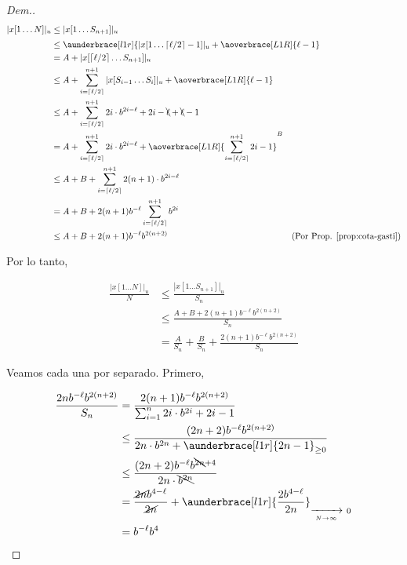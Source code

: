 \documentclass{article}
\DeclarePairedDelimiter\ceil{\lceil}{\rceil}
\theoremstyle{definition} %
\begin{document}
\begin{proof}[Dem.]
\begin{align*}
    |x[1\dots N]|_u
        &\leq |x[1\dots S_{n+1}]|_u \\
        &\leq 
            \aunderbrace[l1r]{|x[1\dots \ceil{\ell/2} - 1]|_u
            + \aoverbrace[L1R]{\ell - 1}^{\hidewidth\text{entre bloques}\hidewidth}}_{A}
            + |x[\ceil{\ell/2} \dots S_{n+1}]|_u \\
        & = A + |x[\ceil{\ell/2} \dots S_{n+1}]|_u \\
        &\leq A +
            \sum_{i = \ceil{\ell/2}}^{n+1}
                |x[S_{i-1}\dots S_{i}]|_u
                + \aoverbrace[L1R]{\ell - 1}^{\hidewidth\text{entre bloques}\hidewidth} \\
        &\leq A +
            \sum_{i = \ceil{\ell/2}}^{n+1}
                2i \cdot b^{2i - \ell} + 2i - \bcancel{\ell}
                + \bcancel{\ell} - 1 \\
        &= A +
            \sum_{i = \ceil{\ell/2}}^{n+1} 2i \cdot b^{2i - \ell}
            + \aoverbrace[L1R]{\sum_{i = \ceil{\ell/2}}^{n+1} 2i - 1}^{B} \\
        &\leq A + B +
            \sum_{i = \ceil{\ell/2}}^{n+1} 2(n+1) \cdot b^{2i - \ell} \\
        &= A + B +
            2(n+1) b^{-\ell}\sum_{i = \ceil{\ell/2}}^{n+1} b^{2i}\\
        &\leq A + B +
            2(n+1) b^{-\ell} b^{2(n+2)} &\text{(Por Prop. \ref{prop:cota-gasti})}
\end{align*}

Por lo tanto,

\begin{align*}
    \frac{|x[1\dots N]|_u}{N}
        &\leq \frac{|x[1\dots S_{n+1}]|_u}{S_n} \\
        &\leq \frac{A + B + 2(n+1) b^{-\ell} b^{2(n+2)}}{S_n} \\
        &= \frac{A}{S_n} + \frac{B}{S_n} + \frac{2(n+1) b^{-\ell} b^{2(n+2)}}{S_n}
\end{align*}

Veamos cada una por separado. Primero,

\begin{align*}
    \frac{2n b^{-\ell} b^{2(n+2)}}{S_n}
        &= \frac
            {2(n+1) b^{-\ell} b^{2(n+2)}}
            {\sum_{i=1}^{n} 2i \cdot b^{2i} + 2i - 1} \\
        &\leq \frac
            {(2n + 2) b^{-\ell} b^{2(n+2)}}
            {2n \cdot b^{2n} + \aunderbrace[l1r]{2n - 1}_{\geq 0}} \\
        &\leq \frac
            {(2n+2) b^{-\ell} b^{\bcancel{2n}+4}}
            {2n \cdot \bcancel{b^{2n}}}\\
        &=\frac{\cancel{2n}b^{4-\ell}}{\cancel{2n}} +
        \aunderbrace[l1r]{\frac{2b^{4-\ell}}{2n}}_{\xrightarrow[N \to \infty]{}\ 0}
        \\ 
        &= b^{-\ell} b^{4}
\end{align*}


\end{proof}
\end{document}
